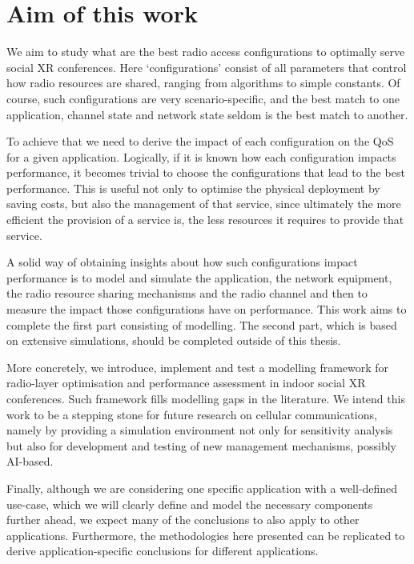 \section{Aim of this work}
\label{sec:aim}

We aim to study what are the best radio access configurations to optimally serve social \ac{XR} conferences. Here `configurations' consist of all parameters that control how radio resources are shared, ranging from algorithms to simple constants. Of course, such configurations are very scenario-specific, and the best match to one application, channel state and network state seldom is the best match to another.

\vspace{0.5cm}

To achieve that we need to derive the impact of each configuration on the \ac{QoS} for a given application. Logically, if it is known how each configuration impacts performance, it becomes trivial to choose the configurations that lead to the best performance. This is useful not only to optimise the physical deployment by saving costs, but also the management of that service, since ultimately the more efficient the provision of a service is, the less resources it requires to provide that service.

\vspace{0.5cm}

A solid way of obtaining insights about how such configurations impact performance is to model and simulate the application, the network equipment, the radio resource sharing mechanisms and the radio channel and then to measure the impact those configurations have on performance. This work aims to complete the first part consisting of modelling. The second part, which is based on extensive simulations, should be completed outside of this thesis.

\vspace{0.5cm}

More concretely, we introduce, implement and test a modelling framework for radio-layer optimisation and performance assessment in indoor social XR conferences. Such framework fills modelling gaps in the literature. We intend this work to be a stepping stone for future research on cellular communications, namely by providing a simulation environment not only for sensitivity analysis but also for development and testing of new management mechanisms, possibly AI-based.

\vspace{0.5cm}

Finally, although we are considering one specific application with a well-defined use-case, which we will clearly define and model the necessary components further ahead, we expect many of the conclusions to also apply to other applications. Furthermore, the methodologies here presented can be replicated to derive application-specific conclusions for different applications.





